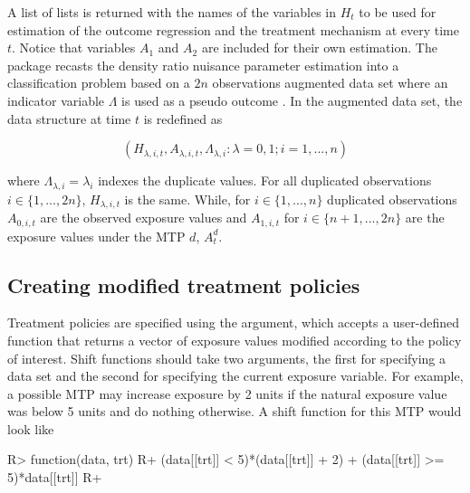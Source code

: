 \documentclass[]{jss}
\begin{document}
A list of lists is returned with the names of the variables in \(H_t\) to be used for estimation of
the outcome regression and the treatment mechanism at every time \(t\).
Notice that variables \(A_1\) and \(A_2\) are included for their own
estimation. The  package recasts the density ratio nuisance
parameter estimation into a classification problem based on a \(2n\)
observations augmented data set where an indicator variable \(\Lambda\)
is used as a pseudo outcome
\citep{chengSemiparametricDensityEstimation2004, qinInferencesCaseControlSemiparametric1998}.
In the augmented data set, the data structure at time \(t\) is
redefined as

\begin{equation}
(H_{\lambda, i, t}, A_{\lambda, i, t}, \Lambda_{\lambda, i} : \lambda = 0, 1; i = 1, ..., n)
\end{equation}

where \(\Lambda_{\lambda, i} = \lambda_i\) indexes the duplicate values.
For all duplicated observations \(i \in \{1, ..., 2n\}\),
\(H_{\lambda, i, t}\) is the same. While, for \(i \in \{1, ..., n\}\)
duplicated observations \(A_{0, i, t}\) are the observed exposure values
and \(A_{1, i, t}\) for \(i \in \{n+1, ..., 2n\}\) are the exposure
values under the MTP \(d\), \(A^{d}_t\).

\hypertarget{creating-modified-treatment-policies}{%
\subsection{Creating modified treatment
policies}\label{creating-modified-treatment-policies}}

Treatment policies are specified using the  argument, which
accepts a user-defined function that returns a vector of exposure values
modified according to the policy of interest. Shift functions should take two
arguments, the first for specifying a data set and the second for
specifying the current exposure variable. For example, a possible MTP
may increase exposure by 2 units if the natural exposure value was below
5 units and do nothing otherwise. A shift function for this MTP would
look like

\begin{CodeChunk}

\begin{CodeInput}
R> function(data, trt) {
R+  (data[[trt]] < 5)*(data[[trt]] + 2) + (data[[trt]] >= 5)*data[[trt]]
R+ }
\end{CodeInput}

\end{CodeChunk}
\end{document}
